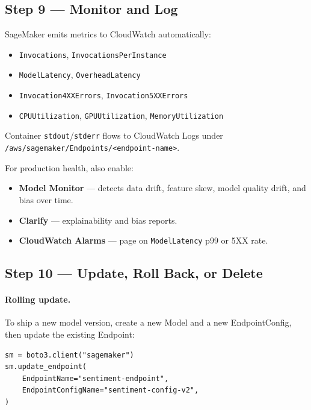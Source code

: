 \documentclass[11pt,a4paper]{article}
\begin{document}
\subsection{Step 9 --- Monitor and Log}

SageMaker emits metrics to CloudWatch automatically:

\begin{itemize}[leftmargin=*,nosep]
    \item \texttt{Invocations}, \texttt{InvocationsPerInstance}
    \item \texttt{ModelLatency}, \texttt{OverheadLatency}
    \item \texttt{Invocation4XXErrors}, \texttt{Invocation5XXErrors}
    \item \texttt{CPUUtilization}, \texttt{GPUUtilization}, \texttt{MemoryUtilization}
\end{itemize}

Container \texttt{stdout}/\texttt{stderr} flows to CloudWatch Logs under
\texttt{/aws/sagemaker/Endpoints/<endpoint-name>}.

For production health, also enable:
\begin{itemize}[leftmargin=*,nosep]
    \item \textbf{Model Monitor} --- detects data drift, feature skew, model
          quality drift, and bias over time.
    \item \textbf{Clarify} --- explainability and bias reports.
    \item \textbf{CloudWatch Alarms} --- page on \texttt{ModelLatency} p99 or
          5XX rate.
\end{itemize}

\subsection{Step 10 --- Update, Roll Back, or Delete}

\paragraph{Rolling update.} To ship a new model version, create a new Model
and a new EndpointConfig, then update the existing Endpoint:

\begin{lstlisting}[style=pycode]
sm = boto3.client("sagemaker")
sm.update_endpoint(
    EndpointName="sentiment-endpoint",
    EndpointConfigName="sentiment-config-v2",
)
\end{lstlisting}
\end{document}
